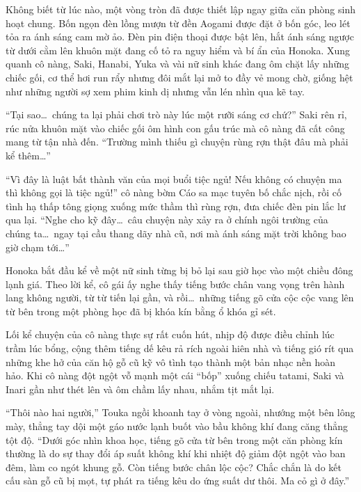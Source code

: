 \documentclass[../main.tex]{subfiles}
\begin{document}
Không biết từ lúc nào, một vòng tròn đã được thiết lập ngay giữa căn phòng sinh hoạt chung. Bốn ngọn đèn lồng mượn từ đền Aogami được đặt ở bốn góc, leo lét tỏa ra ánh sáng cam mờ ảo. Đèn pin điện thoại được bật lên, hắt ánh sáng ngược từ dưới cằm lên khuôn mặt đang cố tỏ ra nguy hiểm và bí ẩn của Honoka. Xung quanh cô nàng, Saki, Hanabi, Yuka và vài nữ sinh khác đang ôm chặt lấy những chiếc gối, cơ thể hơi run rẩy nhưng đôi mắt lại mở to đầy vẻ mong chờ, giống hệt như những người sợ xem phim kinh dị nhưng vẫn lén nhìn qua kẽ tay.

``Tại sao\dots\ chúng ta lại phải chơi trò này lúc một rưỡi sáng cơ chứ?'' Saki rên rỉ, rúc nửa khuôn mặt vào chiếc gối ôm hình con gấu trúc mà cô nàng đã cất công mang từ tận nhà đến. ``Trường mình thiếu gì chuyện rùng rợn thật đâu mà phải kể thêm\dots''

``Vì đây là luật bất thành văn của mọi buổi tiệc ngủ! Nếu không có chuyện ma thì không gọi là tiệc ngủ!'' cô nàng bờm Cáo sa mạc tuyên bố chắc nịch, rồi cố tình hạ thấp tông giọng xuống mức thầm thì rùng rợn, đưa chiếc đèn pin lắc lư qua lại. ``Nghe cho kỹ đây\dots\ câu chuyện này xảy ra ở chính ngôi trường của chúng ta\dots\ ngay tại cầu thang dãy nhà cũ, nơi mà ánh sáng mặt trời không bao giờ chạm tới\dots''

Honoka bắt đầu kể về một nữ sinh từng bị bỏ lại sau giờ học vào một chiều đông lạnh giá. Theo lời kể, cô gái ấy nghe thấy tiếng bước chân vang vọng trên hành lang không người, từ từ tiến lại gần, và rồi\dots\ những tiếng gõ cửa cộc cộc vang lên từ bên trong một phòng học đã bị khóa kín bằng ổ khóa gỉ sét.

Lối kể chuyện của cô nàng thực sự rất cuốn hút, nhịp độ được điều chỉnh lúc trầm lúc bổng, cộng thêm tiếng dế kêu rả rích ngoài hiên nhà và tiếng gió rít qua những khe hở của căn hộ gỗ cũ kỹ vô tình tạo thành một bản nhạc nền hoàn hảo. Khi cô nàng đột ngột vỗ mạnh một cái ``bốp'' xuống chiếu tatami, Saki và Inari gần như thét lên và ôm chầm lấy nhau, nhắm tịt mắt lại.

``Thôi nào hai người,'' Touka ngồi khoanh tay ở vòng ngoài, nhướng một bên lông mày, thẳng tay dội một gáo nước lạnh buốt vào bầu không khí đang căng thẳng tột độ. ``Dưới góc nhìn khoa học, tiếng gõ cửa từ bên trong một căn phòng kín thường là do sự thay đổi áp suất không khí khi nhiệt độ giảm đột ngột vào ban đêm, làm co ngót khung gỗ. Còn tiếng bước chân lộc cộc? Chắc chắn là do kết cấu sàn gỗ cũ bị mọt, tự phát ra tiếng kêu do ứng suất dư thôi. Ma cỏ gì ở đây.''
\end{document}
